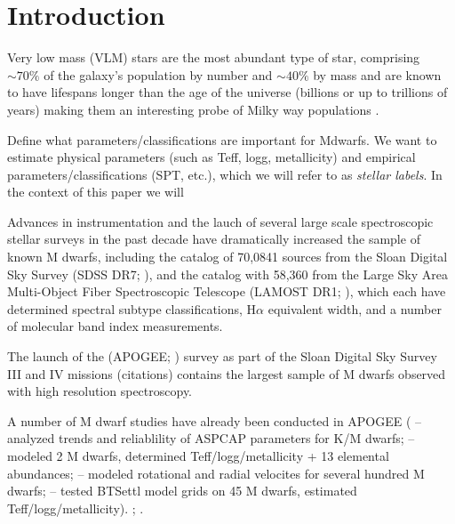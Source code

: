 \documentclass[modern]{aastex62}
\begin{document}
 
\section{Introduction} \label{sec:intro}

Very low mass (VLM) stars are the most abundant type of star, comprising $\sim 70 \%$ of the galaxy's population by number \citep{Bochanski:2010} and $\sim 40 \%$ by mass and are known to have lifespans longer than the age of the universe (billions or up to trillions of years) \citep{Laughlin:1997} making them an interesting probe of Milky way populations \citep{Bochanski:2007}.


Define what parameters/classifications are important for Mdwarfs. We want to estimate physical parameters (such as Teff, logg, metallicity) and empirical parameters/classifications (SPT, etc.), which we will refer to as \emph{stellar labels}. In the context of this paper we will 


Advances in instrumentation and the lauch of several large scale spectroscopic stellar surveys in the past decade have dramatically increased the sample of known M dwarfs, including the \citealt{West:2011} catalog of 70,0841 sources from the Sloan Digital Sky Survey (SDSS DR7; \citealt{Abazajian:2009}), and the \citealt{Yi:2014} catalog with 58,360 from the Large Sky Area Multi-Object Fiber Spectroscopic Telescope (LAMOST DR1; \citealt{Zhao:2012}), which each have determined spectral subtype classifications, H$\alpha$ equivalent width, and a number of molecular band index measurements. 

The launch of the (APOGEE; \citealt{Majewski:2015}) survey as part of the Sloan Digital Sky Survey III and IV missions (citations) contains the largest sample of M dwarfs observed with high resolution spectroscopy. 

A number of M dwarf studies have already been conducted in APOGEE (\citealt{Schmidt:2016} -- analyzed trends and reliablility of ASPCAP parameters for K/M dwarfs; \citealt{Souto:2017} -- modeled 2 M dwarfs, determined Teff/logg/metallicity + 13 elemental abundances; \citealt{Desphande:2013} -- modeled rotational and radial velocites for several hundred M dwarfs; \citealt{Rajpurohit:2018} -- tested BTSettl model grids on 45 M dwarfs, estimated Teff/logg/metallicity). \citealt{Gilhool:2018}; \citealt{Skinner:2018}.
\end{document}
